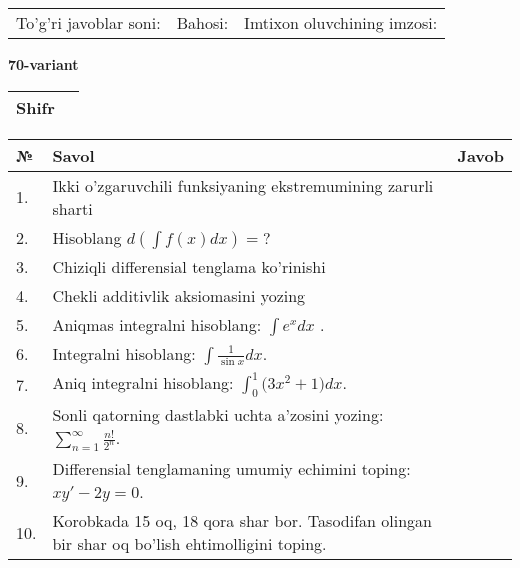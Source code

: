 \documentclass{article}
\begin{document}
  \vspace{1cm}
  
  \begin{tabular}{lll}
  To'g'ri javoblar soni: \underline{\hspace{1.5cm}} & 
  Bahosi: \underline{\hspace{1.5cm}} & 
  Imtixon oluvchining imzosi: \underline{\hspace{2cm}} \\
  \end{tabular}
  
  \egroup
  
  \newpage
  
  
  \textbf{70-variant}\\
  
  \bgroup
  \def\arraystretch{1.6} %
  
  \begin{tabular}{|m{5.7cm}|m{9.5cm}|}
  \hline
  Shifr & \\
  \hline
  \end{tabular}
  
  \vspace{1cm}
  
  \begin{tabular}{|m{0.7cm}|m{10cm}|m{4cm}|}
  \hline
  № & Savol & Javob \\
  \hline
  1. & Ikki o'zgaruvchili funksiyaning ekstremumining zarurli sharti &  \\
  \hline
  2. & Hisoblang \(d\left( \int {f(x)dx} \right) = ?\) &  \\
  \hline
  3. & Chiziqli differensial tenglama ko'rinishi &  \\
  \hline
  4. & Chekli additivlik aksiomasini yozing &  \\
  \hline
  5. & Aniqmas integralni hisoblang: \(\int {e^{x}dx}\) . &  \\
  \hline
  6. & Integralni hisoblang: \(\int {\frac{1}{\sin x}dx}\). &  \\
  \hline
  7. & Aniq integralni hisoblang: \(\int_{0}^{1}{(3x^{2}} + 1)dx\). &  \\
  \hline
  8. & Sonli qatorning dastlabki uchta a'zosini yozing: \(\sum_{n = 1}^{\infty}\frac{n!}{2^{n}}\). &  \\
  \hline
  9. & Differensial tenglamaning umumiy echimini toping: \(xy' - 2y = 0\). &  \\
  \hline
  10. & Korobkada 15 oq, 18 qora shar bor. Tasodifan olingan bir shar oq bo'lish ehtimolligini toping. &  \\
  \hline
  \end{tabular}
  
\end{document}
